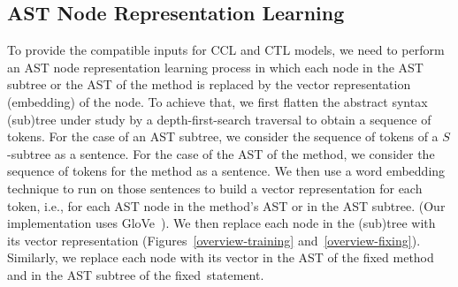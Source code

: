
\subsection{AST Node Representation Learning}

To provide the compatible inputs for CCL and CTL models, we need to
perform an AST node representation learning process in which each node
in the AST subtree or the AST of the method is replaced by the vector
representation (embedding) of the node. To achieve that, we first
flatten the abstract syntax (sub)tree under study by a
depth-first-search traversal to obtain a sequence of tokens. For the
case of an AST subtree, we consider the sequence of tokens of a
$S$-subtree as a sentence. For the case of the AST of the method, we
consider the sequence of tokens for the method as a sentence. We then
use a word embedding technique
to run on those sentences to build a vector representation for each
token, i.e., for each AST node in the method's AST or in the AST
subtree. (Our implementation uses GloVe~\cite{pennington2014glove}).
We then replace each node in the (sub)tree with its vector
representation (Figures~\ref{overview-training}
and~\ref{overview-fixing}). Similarly, we replace each node with its
vector in the AST of the fixed method and in the AST subtree of the
fixed~statement.


